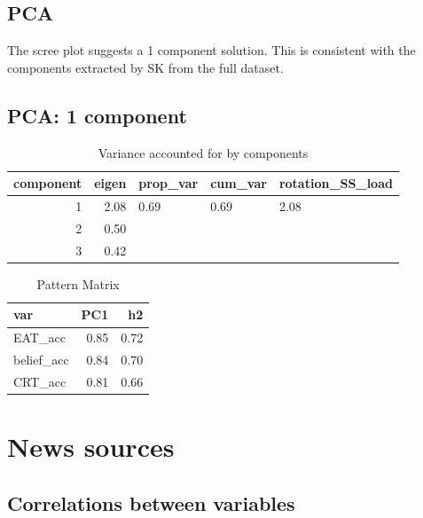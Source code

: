 \documentclass[]{article}
\begin{document}
\hypertarget{pca-2}{%
\subsection{PCA}\label{pca-2}}

The scree plot suggests a 1 component solution. This is consistent with
the components extracted by SK from the full dataset.

\hypertarget{pca-1-component-4}{%
\subsection{PCA: 1 component}\label{pca-1-component-4}}

\begin{table}[H]

\caption{\label{tab:unnamed-chunk-41}Variance accounted for by components}
\centering
\fontsize{6}{8}\selectfont
\begin{tabular}[t]{rrlll}
\toprule
component & eigen & prop\_var & cum\_var & rotation\_SS\_load\\
\midrule
1 & 2.08 & 0.69 & 0.69 & 2.08\\
2 & 0.50 &  &  & \\
3 & 0.42 &  &  & \\
\bottomrule
\end{tabular}
\end{table}

\begin{table}[H]

\caption{\label{tab:unnamed-chunk-41}Pattern Matrix}
\centering
\fontsize{6}{8}\selectfont
\begin{tabular}[t]{lrr}
\toprule
var & PC1 & h2\\
\midrule
EAT\_acc & 0.85 & 0.72\\
belief\_acc & 0.84 & 0.70\\
CRT\_acc & 0.81 & 0.66\\
\bottomrule
\end{tabular}
\end{table}

\newpage

\hypertarget{news-sources}{%
\section{News sources}\label{news-sources}}

\hypertarget{correlations-between-variables-8}{%
\subsection{Correlations between
variables}\label{correlations-between-variables-8}}
\end{document}
